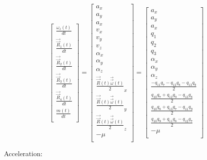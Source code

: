 \documentclass{article}
\begin{document}
\begin{equation}
\begin{bmatrix}
    \frac{\omega_z(t)}{dt} \\
    \frac{\vec{\vec{R}}_1(t)}{dt} \\
    \frac{\vec{\vec{R}}_2(t)}{dt} \\
    \frac{\vec{\vec{R}}_3(t)}{dt} \\
    \frac{\vec{\vec{R}}_4(t)}{dt} \\
    \frac{m(t)}{dt} \\
\end{bmatrix}
=
\begin{bmatrix}
    a_x \\
    a_y \\
    a_x \\
    v_x \\
    v_y \\
    v_z \\
    \alpha_x \\
    \alpha_y \\
    \alpha_z \\
    \frac{\vec{\vec{R}}(t)\vec{\vec{\omega}}(t)}{2}_x \\
    \frac{\vec{\vec{R}}(t)\vec{\vec{\omega}}(t)}{2}_y \\
    \frac{\vec{\vec{R}}(t)\vec{\vec{\omega}}(t)}{2}_z \\
    -\mu \\
\end{bmatrix}
=
\begin{bmatrix}
    a_x \\
    a_y \\
    a_x \\
    q_1 \\
    q_2 \\
    q_3 \\
    \alpha_x \\
    \alpha_y \\
    \alpha_z \\
    \frac{-q_{11}q_7 - q_{12}q_8 - q_{13}q_9}{2} \\
    \frac{q_{10}q_7 + q_{12}q_9 - q_{13}q_8}{2} \\
    \frac{q_{10}q_8 + q_{13}q_7 - q_{11}q_9}{2} \\
    \frac{q_{10}q_9 + q_{11}q_8 - q_{12}q_7}{2} \\
    -\mu \\
\end{bmatrix}
\end{equation}

Acceleration:
\end{document}
